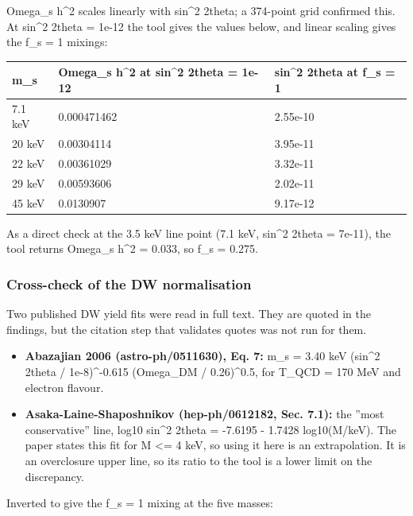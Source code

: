 \documentclass[11pt,a4paper]{article}
\begin{document}
Omega\_s h\textasciicircum{}2 scales linearly with sin\textasciicircum{}2 2theta; a 374-point grid confirmed this. At sin\textasciicircum{}2 2theta = 1e-12 the tool gives the values below, and linear scaling gives the f\_s = 1 mixings:

\begin{longtable}{@{}p{}p{}p{}@{}}
\toprule
\textbf{m\_s} & \textbf{Omega\_s h\textasciicircum{}2 at sin\textasciicircum{}2 2theta = 1e-12} & \textbf{sin\textasciicircum{}2 2theta at f\_s = 1} \\ \midrule \endhead
7.1 keV & 0.000471462 & 2.55e-10 \\
20 keV & 0.00304114 & 3.95e-11 \\
22 keV & 0.00361029 & 3.32e-11 \\
29 keV & 0.00593606 & 2.02e-11 \\
45 keV & 0.0130907 & 9.17e-12 \\
\bottomrule\end{longtable}
As a direct check at the 3.5 keV line point (7.1 keV, sin\textasciicircum{}2 2theta = 7e-11), the tool returns Omega\_s h\textasciicircum{}2 = 0.033, so f\_s = 0.275.

\subsubsection{Cross-check of the DW normalisation}
Two published DW yield fits were read in full text. They are quoted in the findings, but the citation step that validates quotes was not run for them.

\begin{itemize}
  \item \textbf{Abazajian 2006 (astro-ph/0511630), Eq. 7:} m\_s = 3.40 keV (sin\textasciicircum{}2 2theta / 1e-8)\textasciicircum{}-0.615 (Omega\_DM / 0.26)\textasciicircum{}0.5, for T\_QCD = 170 MeV and electron flavour.
  \item \textbf{Asaka-Laine-Shaposhnikov (hep-ph/0612182, Sec. 7.1):} the ''most conservative'' line, log10 sin\textasciicircum{}2 2theta = -7.6195 - 1.7428 log10(M/keV). The paper states this fit for M \textless{}= 4 keV, so using it here is an extrapolation. It is an overclosure upper line, so its ratio to the tool is a lower limit on the discrepancy.
\end{itemize}
Inverted to give the f\_s = 1 mixing at the five masses:
\end{document}
